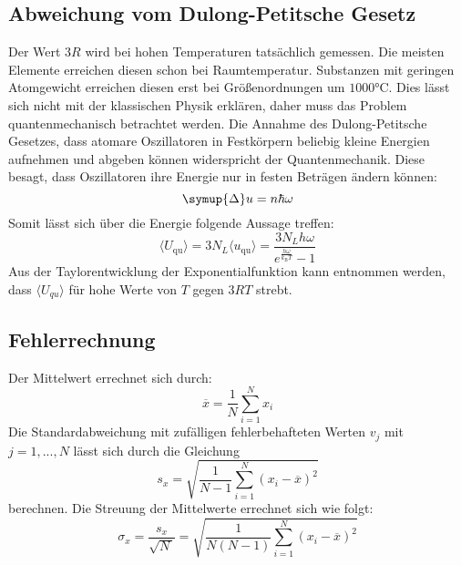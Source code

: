 \subsection{Abweichung vom Dulong-Petitsche Gesetz}
Der Wert $3R$ wird bei hohen Temperaturen tatsächlich gemessen.
Die meisten Elemente erreichen diesen schon bei Raumtemperatur.
Substanzen mit geringen Atomgewicht erreichen diesen erst bei
Größenordnungen um $1000\si{\celsius}$.
Dies lässt sich nicht mit der klassischen Physik erklären,
daher muss das Problem quantenmechanisch betrachtet werden.
Die Annahme des Dulong-Petitsche Gesetzes, dass atomare Oszillatoren in Festkörpern
beliebig kleine Energien aufnehmen und abgeben können widerspricht der Quantenmechanik.
Diese besagt, dass Oszillatoren ihre Energie nur in festen Beträgen ändern können:
\begin{equation}
\symup{\Delta} u = n \hbar \omega
\end{equation}
Somit lässt sich über die Energie folgende Aussage treffen:
\begin{equation}
\langle U_\text{qu} \rangle = 3 N_L \langle u_\text{qu} \rangle = \frac{3 N_L h
\omega}{e^{\frac{h\omega}{k_\text{B}T}}-1}
\end{equation}
Aus der Taylorentwicklung der Exponentialfunktion kann entnommen werden,
dass $\langle U_{qu} \rangle$ für hohe Werte von $T$ gegen $3RT$ strebt.
\subsection{Fehlerrechnung}
Der Mittelwert errechnet sich durch:
\begin{equation}
\label{eq:mittel}
\overline{x}=\frac{1}{N}\sum \limits_{i=1}^N x_i
\end{equation}
Die Standardabweichung mit zufälligen fehlerbehafteten Werten $v_j$ mit $j=1,...,N$ lässt sich durch die Gleichung
\begin{equation}
\label{eq:standard}
s_x=\sqrt{\frac{1}{N-1}\sum \limits_{i=1}^N \left(x_i-\overline{x}\right)^2}
\end{equation}
berechnen.
Die Streuung der Mittelwerte errechnet sich wie folgt:
\begin{equation}
\label{eq:streuung}
\sigma_x=\frac{s_x}{\sqrt{\!N\,}}=\sqrt{\frac{1}{N(N-1)}\sum \limits_{i=1}^N \left(x_i-\overline{x}\right)^2}
\end{equation}
